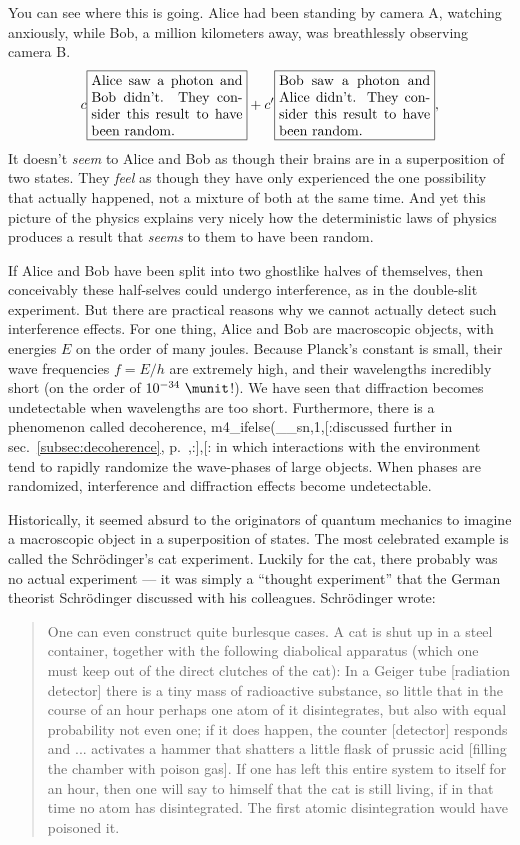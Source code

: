 You can see where this is going.  Alice had been standing by camera A,
watching anxiously, while Bob, a million kilometers away, was
breathlessly observing camera B. 
\begin{equation*}
 c\fbox{\parbox{38mm}{Alice saw a photon and Bob didn't. They consider this result to have been random.}}
+c'\fbox{\parbox{38mm}{Bob saw a photon and Alice didn't. They consider this result to have been random.}},
\end{equation*}
It doesn't \emph{seem} to Alice and Bob as though their brains are in
a superposition of two states. They \emph{feel} as though they have only
experienced the one possibility that actually happened, not a mixture of
both at the same time. And yet this picture of the physics explains very nicely
how the deterministic laws of physics produces a result that \emph{seems}
to them to have been random.

If Alice and Bob have been split into two ghostlike halves of
themselves, then conceivably these half-selves could undergo
interference, as in the double-slit experiment. But there are
practical reasons why we cannot actually detect such interference
effects. For one thing, Alice and Bob are macroscopic objects, with
energies $E$ on the order of many joules. Because Planck's constant is
small, their wave frequencies $f=E/h$ are extremely high, and their
wavelengths incredibly short (on the order of $10^{-34}\ \munit$!). We
have seen that diffraction becomes undetectable when wavelengths are
too short.  Furthermore, there is a phenomenon called decoherence,
m4_ifelse(__sn,1,[:discussed further in sec.~\ref{subsec:decoherence}, p.~\pageref{subsec:decoherence},:],[:%
in which interactions with the environment tend to rapidly randomize
the wave-phases of large objects. When phases are randomized,
interference and diffraction effects become undetectable. 

Historically, it seemed absurd to the originators of quantum mechanics
to imagine a macroscopic object in a superposition of states.
The most celebrated example is called the Schr\"odinger's cat\label{schrodingers-cat}
experiment. Luckily for the cat, there probably was no
actual experiment --- it was simply a ``thought experiment''
that the German theorist Schr\"odinger discussed
with his colleagues. Schr\"odinger wrote:

\begin{quote}
One can even construct quite burlesque cases. A cat is shut
up in a steel container, together with the following
diabolical apparatus (which one must keep out of the direct
clutches of the cat): In a Geiger tube [radiation detector]
there is a tiny mass of radioactive substance, so little
that in the course of an hour perhaps one atom of it
disintegrates, but also with equal probability not even one;
if it does happen, the counter [detector] responds and ...
activates a hammer that shatters a little flask of prussic
acid [filling the chamber with poison gas]. If one has left
this entire system to itself for an hour, then one will say
to himself that the cat is still living, if in that time no
atom has disintegrated. The first atomic disintegration
would have poisoned it.
\end{quote}


